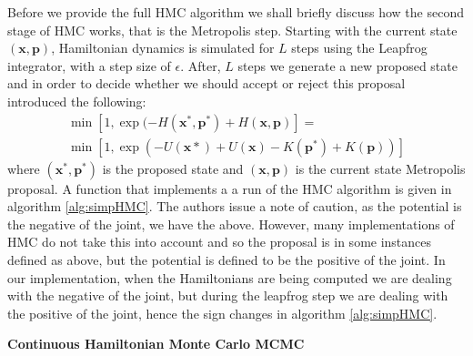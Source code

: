 \documentclass[twoside]{article}
\begin{document}
Before we provide the full HMC algorithm we shall briefly discuss how the second stage of HMC works, that is the Metropolis step. Starting with the current state $(\textbf{x},\textbf{p})$, Hamiltonian dynamics is simulated for $L$ steps using the Leapfrog integrator, with a step size of $\epsilon$. After, $L$ steps we generate a new proposed state and in order to decide whether we should accept or reject this proposal \citep{duane1987hybrid} introduced the following:
\begin{multline}
\min[1, \exp(-H(\textbf{x}^{*}, \textbf{p}^{*}) + H(\textbf{x}, \textbf{p})] =\\
\min[1, \exp(-U(\textbf{x}{*}) + U(\textbf{x}) - K(\textbf{p}^{*}) + K(\textbf{p}))]
\end{multline}where $ (\textbf{x}^{*}, \textbf{p}^{*})$ is the proposed state and $(\textbf{x}, \textbf{p})$ is the current state Metropolis proposal. A function that implements a a run of the HMC algorithm is given in algorithm \ref{alg:simpHMC}. The authors issue a note of caution, as the potential is the negative of the joint, we have the above. However, many implementations of HMC do not take this into account and so the proposal is in some instances defined as above, but the potential is defined to be the positive of the joint. In our implementation, when the Hamiltonians are being computed we are dealing with the negative of the joint, but during the leapfrog step we are dealing with the positive of the joint, hence the sign changes in algorithm \ref{alg:simpHMC}.  
\begin{algorithm}
	\caption{\textbf{Continuous Hamiltonian Monte Carlo MCMC}}
	\begin{algorithmic}[1]
		\EndFor
		  
		\Else
		 
		\EndIf
		\EndFor
		\EndProcedure
	\end{algorithmic}
   \label{alg:simpHMC} 
\end{algorithm}
\end{document}
